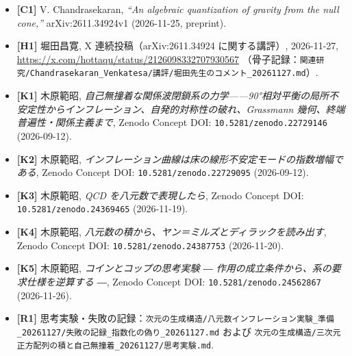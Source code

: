 \documentclass[
  a4paper,
]{ltjsarticle}
\providecommand{\tightlist}{%
  \setlength{\itemsep}{0pt}\setlength{\parskip}{0pt}}
\begin{document}
\begin{itemize}
\tightlist
\item
  \textbf{{[}C1{]}} V. Chandrasekaran, \emph{``An algebraic quantization
  of gravity from the null cone,''} arXiv:2611.34924v1 (2026-11-25,
  preprint).
\item
  \textbf{{[}H1{]}} 堀田昌寛, X 連続投稿（arXiv:2611.34924
  に関する講評）, 2026-11-27,
  \url{https://x.com/hottaqu/status/2126098332707930567}
  （骨子記録：\texttt{関連研究/\allowbreak{}Chandrasekaran\_\allowbreak{}Venkatesa/\allowbreak{}講評/\allowbreak{}堀田先生のコメント\_\allowbreak{}20261127.md}）.
\item
  \textbf{{[}K1{]}} 木原範昭,
  \emph{自己無撞着な関係波閉鎖系の力学------90°相対平衡の局所不安定性からインフレーション、自発的対称性の破れ、Grassmann
  幾何、終端普遍性・関係主義まで}, Zenodo Concept DOI:
  \texttt{10.5281/\allowbreak{}zenodo.22729146} (2026-09-12).
\item
  \textbf{{[}K2{]}} 木原範昭,
  \emph{インフレーション曲線は床の線形不安定モードの指数増幅である},
  Zenodo Concept DOI: \texttt{10.5281/\allowbreak{}zenodo.22729095} (2026-09-12).
\item
  \textbf{{[}K3{]}} 木原範昭, \emph{QCD を八元数で表現したら}, Zenodo
  Concept DOI: \texttt{10.5281/\allowbreak{}zenodo.24369465} (2026-11-19).
\item
  \textbf{{[}K4{]}} 木原範昭,
  \emph{八元数の積から、ヤン＝ミルズとディラックを読み出す}, Zenodo
  Concept DOI: \texttt{10.5281/\allowbreak{}zenodo.24387753} (2026-11-20).
\item
  \textbf{{[}K5{]}} 木原範昭, \emph{コインとコップの思考実験 ―
  作用の成立条件から、系の要求仕様を逆算する ―}, Zenodo Concept DOI:
  \texttt{10.5281/\allowbreak{}zenodo.24562867} (2026-11-26).
\item
  \textbf{{[}R1{]}}
  思考実験・失敗の記録：\texttt{次元の生成構造/\allowbreak{}八元数インフレーション実験\_\allowbreak{}準備\_\allowbreak{}20261127/\allowbreak{}失敗の記録\_\allowbreak{}指数化の偽り\_\allowbreak{}20261127.md}
  および
  \texttt{次元の生成構造/\allowbreak{}三次元正方配列の積と自己無撞着\_\allowbreak{}20261127/\allowbreak{}思考実験.md}.
\end{itemize}
\end{document}
